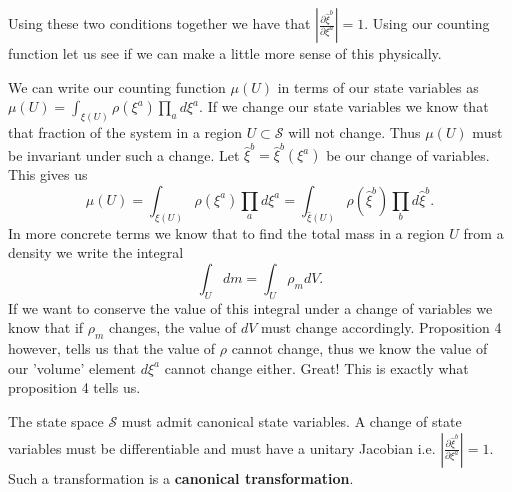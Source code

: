 \documentclass{article}
\begin{document}
	
	Using these two conditions together we have that $\left|\frac{\partial\hat{\xi}^b}{\partial\xi^a}\right| = 1$. Using our counting function let us see if we can make a little more sense of this physically.

	We can write our counting function $\mu(U)$ in terms of our state variables as $\mu(U) = \int_{\xi(U)} \rho(\xi^a) \prod_a d\xi^a$. If we change our state variables we know that that fraction of the system in a region $U \subset \mathcal{S}$ will not change. Thus $\mu(U)$ must be invariant under such a change. Let $\hat{\xi}^b = \hat{\xi}^b(\xi^a)$ be our change of variables. This gives us $$\mu(U) = \int_{\xi(U)} \rho(\xi^a) \prod_a d\xi^a = \int_{\hat{\xi}(U)} \rho(\hat{\xi}^b) \prod_b d\hat{\xi}^b.$$ 
	In more concrete terms we know that to find the total mass in a region $U$ from a density we write the integral $$\int_{U} dm = \int_{U} \rho_m dV.$$ If we want to conserve the value of this integral under a change of variables we know that if $\rho_m$ changes, the value of $dV$ must change accordingly. Proposition 4 however, tells us that the value of $\rho$ cannot change, thus we know the value of our 'volume' element $d\xi^a$ cannot change either. Great! This is exactly what proposition 4 tells us. 
	
	
\begin{prop}
	The state space $\mathcal{S}$ must admit canonical state variables. A change of state variables must be differentiable and must have a unitary Jacobian i.e. $\left|\frac{\partial\hat{\xi}^b}{\partial\xi^a}\right| = 1$. Such a transformation is a \textbf{canonical transformation}.
\end{prop}
\end{document}
